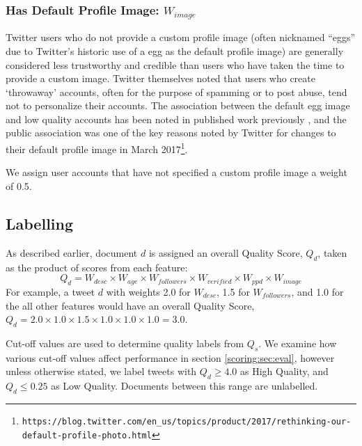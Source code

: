 \subsubsection{Has Default Profile Image: \(W_{image}\)}
Twitter users who do not provide a custom profile image (often nicknamed ``eggs'' due to Twitter's historic use of a egg as the default profile image) are generally considered less trustworthy and credible \citep{Castillo11,Sikdar13, Gun14} than users who have taken the time to provide a custom image.
Twitter themselves noted that users who create `throwaway' accounts, often for the purpose of spamming or to post abuse, tend not to personalize their accounts.
The association between the default egg image and low quality accounts has been noted in published work previously \citep{Sikdar13}, and the public association was one of the key reasons noted by Twitter for changes to their default profile image in March 2017\footnote{\texttt{https://blog.twitter.com/en\_us/topics/product/2017/rethinking-our-\\default-profile-photo.html}}.

We assign user accounts that have not specified a custom profile image a weight of 0.5.

\subsection{Labelling}
As described earlier, document \(d\) is assigned an overall Quality Score, \(Q_d\), taken as the product of scores from each feature:
\begin{displaymath}
	Q_d = W_{desc} \times W_{age} \times W_{followers} \times W_{verified} \times W_{ppd} \times W_{image}
\end{displaymath}
For example, a tweet \(d\) with weights 2.0 for \(W_{desc}\), 1.5 for \(W_{followers}\), and 1.0 for the all other features would have an overall Quality Score, \(
	Q_d =  2.0 \times 1.0 \times 1.5 \times 1.0 \times 1.0  \times 1.0 = 3.0 \).

Cut-off  values are used to determine quality labels from \(Q_s\). We examine how various cut-off values affect performance in section \ref{scoring:sec:eval}, however unless otherwise stated, we label tweets with \(Q_d \geq 4.0\) as High Quality, and \(Q_d \leq 0.25\) as Low Quality. Documents between this range are unlabelled.
